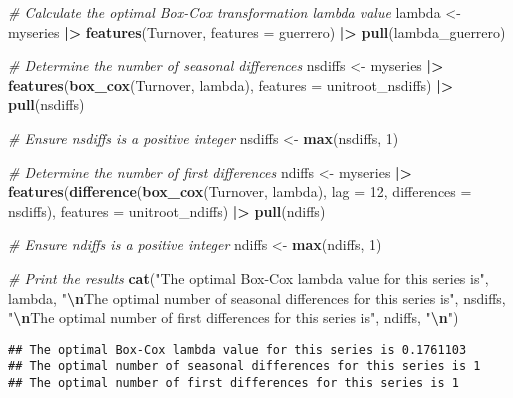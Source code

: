 \documentclass[
]{article}
\newenvironment{Shaded}{\begin{snugshade}}{\end{snugshade}}
\newcommand{\AttributeTok}[1]{\textcolor[rgb]{0.13,0.29,0.53}{#1}}
\newcommand{\CommentTok}[1]{\textcolor[rgb]{0.56,0.35,0.01}{\textit{#1}}}
\newcommand{\DecValTok}[1]{\textcolor[rgb]{0.00,0.00,0.81}{#1}}
\newcommand{\FunctionTok}[1]{\textcolor[rgb]{0.13,0.29,0.53}{\textbf{#1}}}
\newcommand{\NormalTok}[1]{#1}
\newcommand{\OtherTok}[1]{\textcolor[rgb]{0.56,0.35,0.01}{#1}}
\newcommand{\SpecialCharTok}[1]{\textcolor[rgb]{0.81,0.36,0.00}{\textbf{#1}}}
\newcommand{\StringTok}[1]{\textcolor[rgb]{0.31,0.60,0.02}{#1}}
\begin{document}
\begin{Shaded}
\begin{Highlighting}[]
\CommentTok{\# Calculate the optimal Box{-}Cox transformation lambda value}
\NormalTok{lambda }\OtherTok{\textless{}{-}}\NormalTok{ myseries }\SpecialCharTok{|\textgreater{}} 
  \FunctionTok{features}\NormalTok{(Turnover, }\AttributeTok{features =}\NormalTok{ guerrero) }\SpecialCharTok{|\textgreater{}} 
  \FunctionTok{pull}\NormalTok{(lambda\_guerrero)}

\CommentTok{\# Determine the number of seasonal differences}
\NormalTok{nsdiffs }\OtherTok{\textless{}{-}}\NormalTok{ myseries }\SpecialCharTok{|\textgreater{}} 
  \FunctionTok{features}\NormalTok{(}\FunctionTok{box\_cox}\NormalTok{(Turnover, lambda), }\AttributeTok{features =}\NormalTok{ unitroot\_nsdiffs) }\SpecialCharTok{|\textgreater{}} 
  \FunctionTok{pull}\NormalTok{(nsdiffs)}

\CommentTok{\# Ensure nsdiffs is a positive integer}
\NormalTok{nsdiffs }\OtherTok{\textless{}{-}} \FunctionTok{max}\NormalTok{(nsdiffs, }\DecValTok{1}\NormalTok{)}

\CommentTok{\# Determine the number of first differences}
\NormalTok{ndiffs }\OtherTok{\textless{}{-}}\NormalTok{ myseries }\SpecialCharTok{|\textgreater{}} 
  \FunctionTok{features}\NormalTok{(}\FunctionTok{difference}\NormalTok{(}\FunctionTok{box\_cox}\NormalTok{(Turnover, lambda), }\AttributeTok{lag =} \DecValTok{12}\NormalTok{, }\AttributeTok{differences =}\NormalTok{ nsdiffs), }
           \AttributeTok{features =}\NormalTok{ unitroot\_ndiffs) }\SpecialCharTok{|\textgreater{}} 
  \FunctionTok{pull}\NormalTok{(ndiffs)}

\CommentTok{\# Ensure ndiffs is a positive integer}
\NormalTok{ndiffs }\OtherTok{\textless{}{-}} \FunctionTok{max}\NormalTok{(ndiffs, }\DecValTok{1}\NormalTok{)}

\CommentTok{\# Print the results}
\FunctionTok{cat}\NormalTok{(}\StringTok{"The optimal Box{-}Cox lambda value for this series is"}\NormalTok{, lambda,}
    \StringTok{"}\SpecialCharTok{\textbackslash{}n}\StringTok{The optimal number of seasonal differences for this series is"}\NormalTok{, nsdiffs,}
    \StringTok{"}\SpecialCharTok{\textbackslash{}n}\StringTok{The optimal number of first differences for this series is"}\NormalTok{, ndiffs, }\StringTok{"}\SpecialCharTok{\textbackslash{}n}\StringTok{"}\NormalTok{)}
\end{Highlighting}
\end{Shaded}

\begin{verbatim}
## The optimal Box-Cox lambda value for this series is 0.1761103 
## The optimal number of seasonal differences for this series is 1 
## The optimal number of first differences for this series is 1
\end{verbatim}
\end{document}

